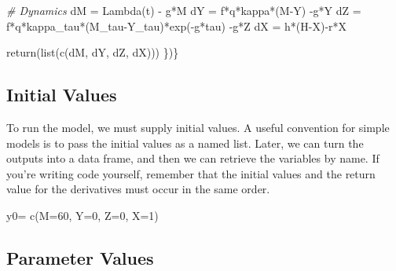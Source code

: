 \documentclass[
]{book}
\newenvironment{Shaded}{\begin{snugshade}}{\end{snugshade}}
\newcommand{\AttributeTok}[1]{\textcolor[rgb]{0.77,0.63,0.00}{#1}}
\newcommand{\CommentTok}[1]{\textcolor[rgb]{0.56,0.35,0.01}{\textit{#1}}}
\newcommand{\DecValTok}[1]{\textcolor[rgb]{0.00,0.00,0.81}{#1}}
\newcommand{\FunctionTok}[1]{\textcolor[rgb]{0.00,0.00,0.00}{#1}}
\newcommand{\NormalTok}[1]{#1}
\newcommand{\OtherTok}[1]{\textcolor[rgb]{0.56,0.35,0.01}{#1}}
\newcommand{\SpecialCharTok}[1]{\textcolor[rgb]{0.00,0.00,0.00}{#1}}
\begin{document}
\begin{Shaded}
\begin{Highlighting}[]
  \CommentTok{\# Dynamics }
\NormalTok{  dM }\OtherTok{=} \FunctionTok{Lambda}\NormalTok{(t) }\SpecialCharTok{{-}}\NormalTok{ g}\SpecialCharTok{*}\NormalTok{M}
\NormalTok{  dY }\OtherTok{=}\NormalTok{ f}\SpecialCharTok{*}\NormalTok{q}\SpecialCharTok{*}\NormalTok{kappa}\SpecialCharTok{*}\NormalTok{(M}\SpecialCharTok{{-}}\NormalTok{Y) }\SpecialCharTok{{-}}\NormalTok{g}\SpecialCharTok{*}\NormalTok{Y}
\NormalTok{  dZ }\OtherTok{=}\NormalTok{ f}\SpecialCharTok{*}\NormalTok{q}\SpecialCharTok{*}\NormalTok{kappa\_tau}\SpecialCharTok{*}\NormalTok{(M\_tau}\SpecialCharTok{{-}}\NormalTok{Y\_tau)}\SpecialCharTok{*}\FunctionTok{exp}\NormalTok{(}\SpecialCharTok{{-}}\NormalTok{g}\SpecialCharTok{*}\NormalTok{tau) }\SpecialCharTok{{-}}\NormalTok{g}\SpecialCharTok{*}\NormalTok{Z}
\NormalTok{  dX }\OtherTok{=}\NormalTok{ h}\SpecialCharTok{*}\NormalTok{(H}\SpecialCharTok{{-}}\NormalTok{X)}\SpecialCharTok{{-}}\NormalTok{r}\SpecialCharTok{*}\NormalTok{X}
  
  \FunctionTok{return}\NormalTok{(}\FunctionTok{list}\NormalTok{(}\FunctionTok{c}\NormalTok{(dM, dY, dZ, dX)))}
\NormalTok{\})\} }
\end{Highlighting}
\end{Shaded}

\hypertarget{initial-values}{%
\subsection{Initial Values}\label{initial-values}}

To run the model, we must supply initial values. A useful convention for simple models is to pass the initial values as a named list. Later, we can turn the outputs into a data frame, and then we can retrieve the variables by name. If you're writing code yourself, remember that the initial values and the return value for the derivatives must occur in the same order.

\begin{Shaded}
\begin{Highlighting}[]
\NormalTok{y0}\OtherTok{=} \FunctionTok{c}\NormalTok{(}\AttributeTok{M=}\DecValTok{60}\NormalTok{, }\AttributeTok{Y=}\DecValTok{0}\NormalTok{, }\AttributeTok{Z=}\DecValTok{0}\NormalTok{, }\AttributeTok{X=}\DecValTok{1}\NormalTok{)}
\end{Highlighting}
\end{Shaded}

\hypertarget{parameter-values}{%
\subsection{Parameter Values}\label{parameter-values}}
\end{document}
